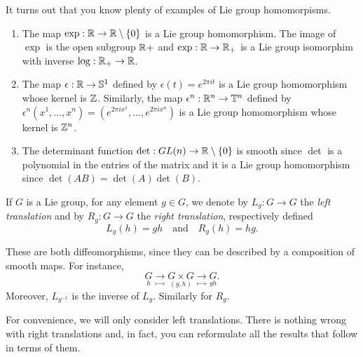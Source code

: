 \begin{example}
  It turns out that you know plenty of examples of Lie group homomorpisms.
  \begin{enumerate}
    \item The map $\exp:\mathbb{R}\to\mathbb{R}\setminus\{0\}$ is a Lie group homomorphism. The image of $\exp$ is the open subgroup $\mathbb{R}+$ and $\exp:\mathbb{R}\to\mathbb{R}_+$ is a Lie group isomorphim with inverse $\log:\mathbb{R}_+\to\mathbb{R}$.
    \item The map $\epsilon:\mathbb{R}\to\mathbb{S}^1$ defined by $\epsilon(t)=e^{2\pi i t}$ is a Lie group homomorphism whose kernel is $\mathbb{Z}$. Similarly, the map $\epsilon^n:\mathbb{R}^n\to\mathbb{T}^n$ defined by $\epsilon^n(x^1, \ldots, x^n)=(e^{2\pi i x^1}, \ldots, e^{2\pi i x^n})$ is a Lie group homomorphism whose kernel is $\mathbb{Z}^n$.
    \item The determinant function $\det:GL(n)\to\mathbb{R}\setminus\{0\}$ is smooth since $\det$ is a polynomial in the entries of the matrix and it is a Lie group homomorphism since $\det (AB) = \det(A) \det(B)$.
  \end{enumerate}
\end{example}

\begin{definition}
  If $G$ is a Lie group, for any element $g\in G$, we denote by $L_g:G\to G$ the \emph{left translation} and by $R_g:G\to G$ the \emph{right translation}, respectively defined
  \begin{equation}
    L_g(h) = gh
    \quad\mbox{and}\quad
    R_g(h) = hg.
  \end{equation}
\end{definition}

These are both diffeomorphisms, since they can be described by a composition of smooth maps. For instance,
\begin{equation}
  \underset{h}{G} \underset{\mapsto}{\to} \underset{(g,h)}{G\times G} \underset{\mapsto}{\to} \underset{gh}{G}.
\end{equation}
Moreover, $L_{g^{-1}}$ is the inverse of $L_g$.
Similarly for $R_g$.

\begin{remark}
  For convenience, we will only consider left translations.
  There is nothing wrong with right translations and, in fact, you can reformulate all the results that follow in terms of them.
\end{remark}

